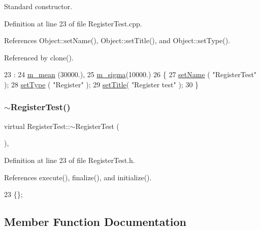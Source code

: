 Standard constructor. 



Definition at line 23 of file Register\+Test.\+cpp.



References Object\+::set\+Name(), Object\+::set\+Title(), and Object\+::set\+Type().



Referenced by clone().


\begin{DoxyCode}
23                              :
24   \hyperlink{classRegisterTest_aba5ac8088017236617d2244fc0c261b9}{m\_mean} (30000.),
25   \hyperlink{classRegisterTest_a17f1f3646bf00ae7ab6744afca9e6813}{m\_sigma}(10000.)
26   \{
27   \hyperlink{classObject_ae30fea75683c2d149b6b6d17c09ecd0c}{setName} ( \textcolor{stringliteral}{"RegisterTest"} );
28   \hyperlink{classObject_aae534cc9d982bcb9b99fd505f2e103a5}{setType} ( \textcolor{stringliteral}{"Register"} );
29   \hyperlink{classObject_a89557dbbad5bcaa02652f5d7fa35d20f}{setTitle}( \textcolor{stringliteral}{"Register test"} );
30 \}
\end{DoxyCode}
\mbox{\label{classRegisterTest_aa52cee0f106fabf76ee320c391ec94a2}} 
\subsubsection{\texorpdfstring{$\sim$\+Register\+Test()}{~RegisterTest()}}
{\footnotesize\ttfamily virtual Register\+Test\+::$\sim$\+Register\+Test (\begin{DoxyParamCaption}{ }\end{DoxyParamCaption})\hspace{0.3cm}{\ttfamily [inline]}, {\ttfamily [virtual]}}



Definition at line 23 of file Register\+Test.\+h.



References execute(), finalize(), and initialize().


\begin{DoxyCode}
23 \{\}; 
\end{DoxyCode}


\subsection{Member Function Documentation}
\mbox{\label{classAttrib_a235f773af19c900264a190b00a3b4ad7}} 
